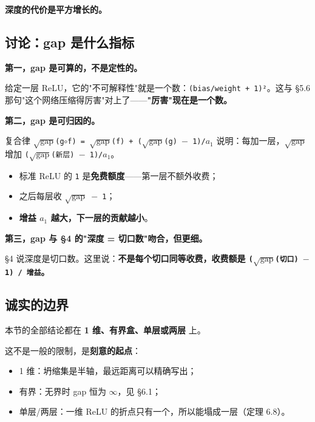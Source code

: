 \documentclass[11pt,a4paper]{ctexart}
\begin{document}
\textbf{深度的代价是平方增长的。}

\subsection{讨论：gap 是什么指标}

\textbf{第一，gap 是可算的，不是定性的。}

给定一层 ReLU，它的"不可解释性"就是一个数：\texttt{(bias/weight + 1)²}。这与 §5.6 那句"这个网络压缩得厉害"对上了——\textbf{"厉害"现在是一个数。}

\textbf{第二，gap 是可归因的。}

复合律 \texttt{\ensuremath{\sqrt{\mathrm{gap}}}(g\ensuremath{\circ}f) = \ensuremath{\sqrt{\mathrm{gap}}}(f) + (\ensuremath{\sqrt{\mathrm{gap}}}(g) \ensuremath{-} 1)/\ensuremath{a_{1}}} 说明：每加一层，\texttt{\ensuremath{\sqrt{\mathrm{gap}}}} 增加 \texttt{(\ensuremath{\sqrt{\mathrm{gap}}}(新层) \ensuremath{-} 1)/\ensuremath{a_{1}}}。

\begin{itemize}
\item 标准 ReLU 的 \texttt{1} 是\textbf{免费额度}——第一层不额外收费；
\item 之后每层收 \texttt{\ensuremath{\sqrt{\mathrm{gap}}} \ensuremath{-} 1}；
\item \textbf{增益 \texttt{\ensuremath{a_{1}}} 越大，下一层的贡献越小}。
\end{itemize}

\textbf{第三，gap 与 §4 的"深度 = 切口数"吻合，但更细。}

§4 说深度是切口数。这里说：\textbf{不是每个切口同等收费，收费额是 \texttt{(\ensuremath{\sqrt{\mathrm{gap}}}(切口) \ensuremath{-} 1) / 增益}。}

\subsection{诚实的边界}

本节的全部结论都在 \textbf{1 维、有界盒、单层或两层} 上。

这不是一般的限制，是\textbf{刻意的起点}：

\begin{itemize}
\item 1 维：坍缩集是半轴，最远距离可以精确写出；
\item 有界：无界时 gap 恒为 \ensuremath{\infty}，见 §6.1；
\item 单层/两层：一维 ReLU 的折点只有一个，所以能塌成一层（定理 6.8）。
\end{itemize}
\end{document}
